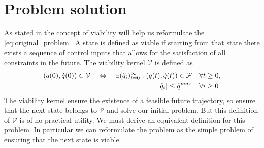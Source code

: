 \documentclass{article}
\begin{document}
\section{Problem solution}
As stated in \cite{DelPrete2018} the concept of viability will help us reformulate the \ref{eq:original_problem}. A state is defined as viable if starting from that state there exists a sequence of control inputs that allows for the satisfaction of all constraints in the future. The viability kernel $\mathcal{V}$ is defined as
\begin{equation} \begin{aligned}
    (q(0),\dot{q}(0)) \in \mathcal{V}     \quad \Leftrightarrow \quad \exists (\ddot{q}_i)_{i=0}^\infty :  (q(t), \dot{q}(t)) \in \mathcal{F} \quad &\forall t \ge 0, \\ 
    |\ddot{q}_i| \le \ddot{q}^{max} \quad &\forall i \ge 0
    \end{aligned} 
\end{equation}
The viability kernel ensure the existence of a feasible future trajectory, so ensure that the next state belongs to $\mathcal{V}$ and solve our initial problem. But this definition of $\mathcal{V}$ is of no practical utility.%
We must derive an equivalent definition for this problem. In particular we can reformulate the problem as the simple problem of ensuring that the next state is viable.
\end{document}
